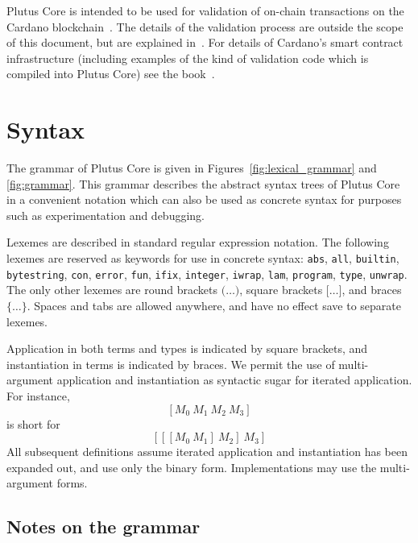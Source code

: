 \documentclass[a4paper]{article}
\begin{document}
Plutus Core is intended to be used for validation of on-chain
transactions on the Cardano blockchain~\citep{Cardano}.  The details
of the validation process are outside the scope of this document, but
are explained in~\citep{EUTXO}. For details of Cardano's smart
contract infrastructure (including examples of the kind of validation
code which is compiled into Plutus Core) see the
book~\citep{Plutus-book}.



\section{Syntax}

The grammar of Plutus Core is given in
Figures~\ref{fig:lexical_grammar} and
\ref{fig:grammar}. This grammar describes the abstract
syntax trees of Plutus Core in a convenient notation which can also be
used as concrete syntax for purposes such as experimentation and
debugging.

Lexemes are described in standard regular expression notation.  The
following lexemes are reserved as keywords for use in concrete syntax:
\texttt{abs}, \texttt{all}, \texttt{builtin}, \texttt{bytestring},
\texttt{con}, \texttt{error}, \texttt{fun}, \texttt{ifix},
\texttt{integer}, \texttt{iwrap}, \texttt{lam}, \texttt{program},
\texttt{type}, \texttt{unwrap}.  The only other lexemes
are round brackets $\texttt{(}\ldots\texttt{)}$, square brackets
$\texttt{[}\ldots\texttt{]}$, and braces
$\texttt{\{}\ldots\texttt{\}}$.  Spaces and tabs are allowed anywhere,
and have no effect save to separate lexemes.

Application in both terms and types is indicated by square
brackets, and instantiation in terms is indicated by braces. We
permit the use of multi-argument application and instantiation as
syntactic sugar for iterated application.
For instance,
\[
  [M_0 ~ M_1 ~ M_2 ~ M_3]
  \]
\noindent is short for
\[
  [[[M_0 ~ M_1] ~ M_2] ~ M_3]
\]
All subsequent definitions assume iterated application and instantiation
has been expanded out, and use only the binary form. Implementations
may use the multi-argument forms.






\newcommand\fixtype[1]{\mu\,\alpha.#1}  %

\subsection{Notes on the grammar}
\end{document}
